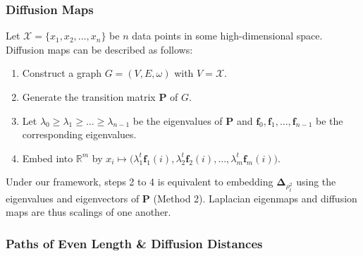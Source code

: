 \documentclass[professionalfonts, hyperref={pdfpagelabels=false,
  colorlinks=true, linkcolor=purple}]{beamer}
\begin{document}
\begin{frame}[label=diffusion_maps]
  \frametitle{Diffusion Maps}
    Let $\mathcal{X} = \{x_1,x_2,\dots,x_n\}$ be $n$ data points in some
    high-dimensional space. Diffusion maps
    \cite{coifman06:_diffus_maps} can be described as follows:
    \vskip10pt
  \begin{enumerate}
  \item Construct a graph $G = (V,E,\omega)$ with $V =
    \mathcal{X}$.
  \item Generate the transition matrix $\bm{P}$ of $G$.
  \item Let $\lambda_0 \geq \lambda_1 \geq \dots
    \geq \lambda_{n-1}$ be the eigenvalues of $\mathbf{P}$ and $\bm{f}_0, \bm{f}_1,
    \dots, \bm{f}_{n-1}$ be the corresponding eigenvalues.
  \item Embed into $\mathbb{R}^{m}$ by $x_i \mapsto \bigl(
    \lambda_{1}^{t} \bm{f}_{1}(i), \lambda_{2}^{t} \bm{f}_{2}(i),
    \dots, \lambda_{m}^{t} \bm{f}_{m}(i))$.
  \end{enumerate}
  \begin{alertblock}{}
    Under our framework, steps 2 to 4 is equivalent to embedding
    $\bm{\Delta}_{\rho_{t}^2}$ using the eigenvalues and eigenvectors
    of $\mathbf{P}$ (Method 2). Laplacian eigenmaps and diffusion maps
    are thus \alert{scalings} of one another.
  \end{alertblock}
\end{frame}

\begin{frame}
\frametitle{Paths of Even Length  \& Diffusion Distances}
  \subfiglabelskip=0pt
  \begin{figure}[htbp]
    \label{fig:two-step}
    \centering
    \hspace{3pt}
  \end{figure}
\end{frame}
\end{document}
